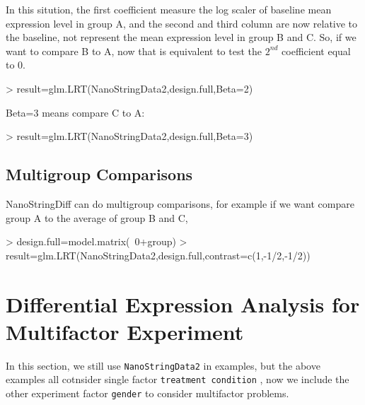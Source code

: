 \documentclass[12pt]{article}
\begin{document}
In this sitution, the first coefficient measure the log scaler of baseline 
mean expression level in group A, and the second and  third column are now 
relative to the baseline, not represent the mean expression level in 
group B and C. So, if we want to compare B to A, now that is equivalent 
to test the $2^{nd}$ coefficient equal to 0.

\begin{Schunk}
\begin{Sinput}
> result=glm.LRT(NanoStringData2,design.full,Beta=2)
\end{Sinput}
\end{Schunk}

Beta=3 means compare C to A:

\begin{Schunk}
\begin{Sinput}
> result=glm.LRT(NanoStringData2,design.full,Beta=3)
\end{Sinput}
\end{Schunk}






\subsection{Multigroup Comparisons}

NanoStringDiff can do multigroup comparisons, for example if we want 
compare group A to the average of group B and C, 

\begin{Schunk}
\begin{Sinput}
> design.full=model.matrix(~0+group)
> result=glm.LRT(NanoStringData2,design.full,contrast=c(1,-1/2,-1/2))
\end{Sinput}
\end{Schunk}



\section{Differential Expression Analysis for Multifactor Experiment}

In this section, we still use {\tt NanoStringData2} in examples, but the above 
examples all cotnsider single factor {\tt treatment condition} , now we include 
the other experiment factor {\tt gender} to consider multifactor problems.
\end{document}

